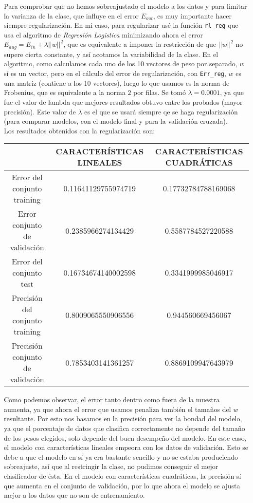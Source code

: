 \documentclass{article}
\begin{document}
Para comprobar que no hemos sobreajustado el modelo a los datos y para limitar la varianza de la clase, que influye en el error $E_{out}$, es muy importante hacer siempre regularización. En mi caso, para regularizar usé la función \texttt{rl\_reg} que usa el algoritmo de \textit{Regresión Logistica} minimizando ahora el error $E_{aug} = E_{in} + \lambda ||w||^2$, que es equivalente a imponer la restricción de que $||w||^2$ no supere cierta constante, y así acotamos la variabilidad de la clase. En el algoritmo, como calculamos cada uno de los 10 vectores de peso por separado, $w$ sí es un vector, pero en el cálculo del error de regularización, con \texttt{Err\_reg}, $w$ es una matriz (contiene a los 10 vectores), luego lo que usamos es la norma de Frobenius, que es equivalente a la norma $2$ por filas. Se tomó $\lambda = 0.0001$, ya que fue el valor de lambda que mejores resultados obtuvo entre los probados (mayor precisión). Este valor de $\lambda$ es el que se usará siempre qe se haga regularización (para comparar modelos, con el modelo final y para la validación cruzada).\\

Los resultados obtenidos con la regularización son:

\begin{center}
\begin{tabular}{|c|c|c|}
\hline
\multicolumn{1}{|c|}{}& \textbf{CARACTERÍSTICAS LINEALES} &
\textbf{CARACTERÍSTICAS CUADRÁTICAS}  \\ \hline
  Error del conjunto training       & 0.11641129755974719 & 0.17732784788169068 \\
  Error conjunto de validación      & 0.2385966274134429  & 0.5587784527220588 \\
  Error del conjunto test           & 0.16734674140002598 & 0.3341999985046917 \\
  Precisión del conjunto training   & 0.8009065550906556  & 0.944560669456067 \\
  Precisión conjunto de validación  & 0.7853403141361257  & 0.8869109947643979 \\ \hline
\end{tabular}
\end{center}

Como podemos observar, el error tanto dentro como fuera de la muestra aumenta, ya que ahora el error que usamos penaliza también el tamaños del $w$ resultante. Por esto nos basamos en la precisión para ver la bondad del modelo, ya que el porcentaje de datos que clasifica correctamente no depende del tamaño de los pesos elegidos, solo depende del buen desempeño del modelo. En este caso, el modelo con características lineales empeora con los datos de validación. Esto se debe a que el modelo en sí ya era bastante sencillo y no se estaba produciendo sobreajuste, así que al restringir la clase, no pudimos conseguir el mejor clasificador de ésta. En el modelo con características cuadráticas, la precisión sí que aumenta en el conjunto de validación, por lo que ahora el modelo se ajusta mejor a los datos que no son de entrenamiento.\\
\end{document}
